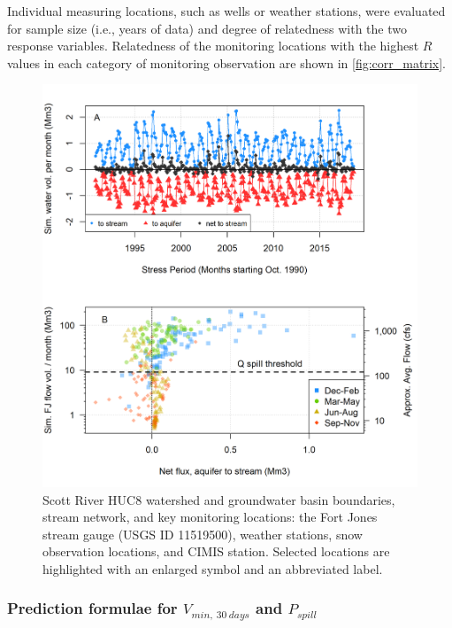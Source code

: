 \documentclass[hess, manuscript]{copernicus}
\begin{document}
Individual measuring locations, such as wells or weather stations, were
evaluated for sample size (i.e., years of data) and degree of
relatedness with the two response variables. Relatedness of the
monitoring locations with the highest \(R\) values in each category of
monitoring observation are shown in \autoref{fig:corr_matrix}.

\begin{figure}
\includegraphics[width=1\linewidth]{f03} \caption{\label{fig:watershed_fig_ch3} Scott River HUC8 watershed and groundwater basin boundaries, stream network, and key monitoring locations: the Fort Jones stream gauge (USGS ID 11519500), weather stations, snow observation locations, and CIMIS station. Selected locations are highlighted with an enlarged symbol and an abbreviated label.}\label{fig:watershed_fig_ch3}
\end{figure}

\subsubsection{\texorpdfstring{Prediction formulae for
\(V_{min,~30~days}\) and
\(P_{spill}\)}{Prediction formulae for V\_\{min,\textasciitilde30\textasciitilde days\} and P\_\{spill\}}}
\end{document}
